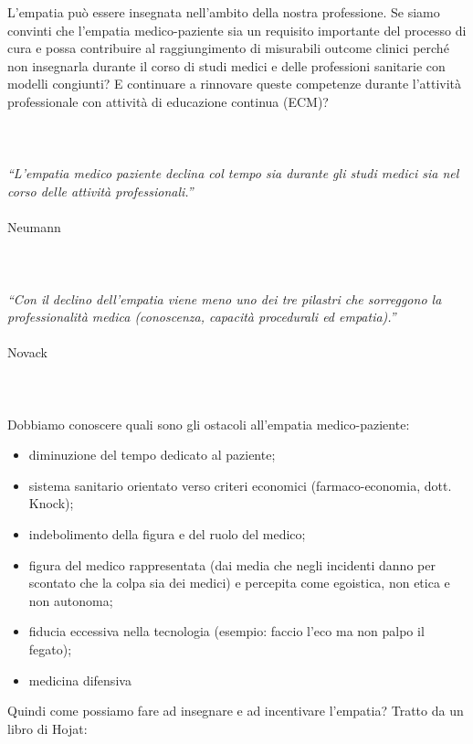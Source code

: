 L'empatia può essere insegnata nell'ambito della nostra professione. Se
siamo convinti che l'empatia medico-paziente sia un requisito importante
del processo di cura e possa contribuire al raggiungimento di misurabili
outcome clinici perché non insegnarla durante il corso di studi medici e
delle professioni sanitarie con modelli congiunti? E continuare a
rinnovare queste competenze durante l'attività professionale con
attività di educazione continua (ECM)?
\\\\\\\\
\emph{``L'empatia medico paziente declina col tempo sia durante gli
studi medici sia nel corso delle attività professionali.''}
\\\\
Neumann
\\\\\\\\
\emph{``Con il declino dell'empatia viene meno uno dei tre pilastri che
sorreggono la professionalità medica (conoscenza, capacità procedurali
ed empatia).''}
\\\\
Novack
\\\\\\\\
Dobbiamo conoscere quali sono gli ostacoli all'empatia medico-paziente:

\begin{itemize}
\item
  diminuzione del tempo dedicato al paziente;
\item
  sistema sanitario orientato verso criteri economici (farmaco-economia,
  dott. Knock);
\item
  indebolimento della figura e del ruolo del medico;
\item
  figura del medico rappresentata (dai media che negli incidenti danno
  per scontato che la colpa sia dei medici) e percepita come egoistica,
  non etica e non autonoma;
\item
  fiducia eccessiva nella tecnologia (esempio: faccio l'eco ma non palpo
  il fegato);
\item
  medicina difensiva
\end{itemize}

Quindi come possiamo fare ad insegnare e ad incentivare l'empatia?
Tratto da un libro di Hojat:

